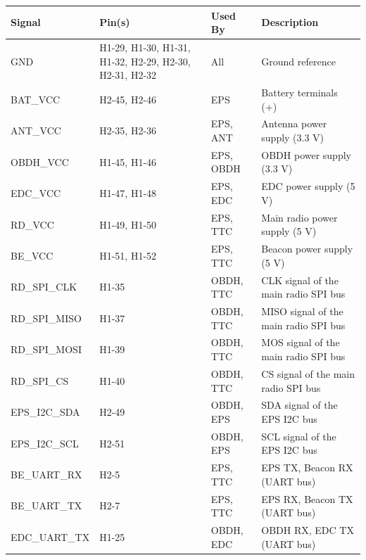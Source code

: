 \begin{table}[!h]
    \centering
    \begin{tabular}{lL{0.2\textwidth}L{0.15\textwidth}L{0.35\textwidth}}
        \toprule[1.5pt]
        \textbf{Signal} & \textbf{Pin(s)} & \textbf{Used By}     & \textbf{Description} \\
        \midrule
        GND             & H1-29, H1-30, H1-31, H1-32, H2-29, H2-30, H2-31, H2-32 & All                  & Ground reference \\
        BAT\_VCC        & H2-45, H2-46    & EPS                  & Battery terminals (+) \\
        ANT\_VCC        & H2-35, H2-36    & EPS, ANT             & Antenna power supply (3.3 V) \\
        OBDH\_VCC       & H1-45, H1-46    & EPS, OBDH            & OBDH power supply (3.3 V) \\
        EDC\_VCC        & H1-47, H1-48    & EPS, EDC             & EDC power supply (5 V) \\
        RD\_VCC         & H1-49, H1-50    & EPS, TTC             & Main radio power supply (5 V) \\
        BE\_VCC         & H1-51, H1-52    & EPS, TTC             & Beacon power supply (5 V) \\
        RD\_SPI\_CLK    & H1-35           & OBDH, TTC            & CLK signal of the main radio SPI bus \\
        RD\_SPI\_MISO   & H1-37           & OBDH, TTC            & MISO signal of the main radio SPI bus \\
        RD\_SPI\_MOSI   & H1-39           & OBDH, TTC            & MOS signal of the main radio SPI bus \\
        RD\_SPI\_CS     & H1-40           & OBDH, TTC            & CS signal of the main radio SPI bus \\
        EPS\_I2C\_SDA   & H2-49           & OBDH, EPS            & SDA signal of the EPS I2C bus \\
        EPS\_I2C\_SCL   & H2-51           & OBDH, EPS            & SCL signal of the EPS I2C bus \\
        BE\_UART\_RX    & H2-5            & EPS, TTC             & EPS TX, Beacon RX (UART bus) \\
        BE\_UART\_TX    & H2-7            & EPS, TTC             & EPS RX, Beacon TX (UART bus) \\
        EDC\_UART\_TX   & H1-25           & OBDH, EDC            & OBDH RX, EDC TX (UART bus) \\

\end{tabular}
\end{table}
